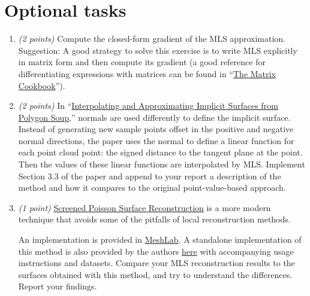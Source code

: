 \documentclass[11pt]{amsart}
\begin{document}
\section*{Optional tasks}
\begin{enumerate}
\item \emph{(2 points)}
    Compute the closed-form gradient of the MLS approximation. Suggestion: A good
    strategy to solve this exercise is to write MLS explicitly in matrix
    form and then compute its gradient (a good reference for differentiating
    expressions with matrices can be found in ``\href{http://orion.uwaterloo.ca/~hwolkowi/matrixcookbook.pdf}{The Matrix Cookbook}'').

\item \emph{(2 points)}
    In ``\href{http://graphics.berkeley.edu/papers/Shen-IAI-2004-08/index.html}{Interpolating
    and Approximating Implicit Surfaces from Polygon Soup},'' normals are used
    differently to define the implicit surface. Instead of generating new
    sample points offset in the positive and negative normal directions, the
    paper uses the normal to define a linear function for
    each point cloud point: the signed distance to the tangent plane at the
    point. Then the values of these linear functions are interpolated by MLS.
    Implement Section 3.3 of the paper and append to your report a
    description of the method and how it compares to the original
    point-value-based approach.


\item
\emph{(1 point)}
        \href{http://www.cs.jhu.edu/~misha/MyPapers/ToG13.pdf}{Screened Poisson
        Surface Reconstruction} is a more modern technique that avoids some of
        the pitfalls of local reconstruction methods.

        An implementation is provided in \href{http://www.meshlab.net}{MeshLab}.
        A standalone implementation of this method is also provided by the
        authors
        \href{http://www.cs.jhu.edu/~misha/Code/PoissonRecon/Version9.01/}{here}
        with accompanying usage instructions and datasets. Compare your MLS
        reconstruction results to the surfaces obtained with this method, and
        try to understand the differences. Report your findings.

\end{enumerate}

% 
% 
\end{document}
